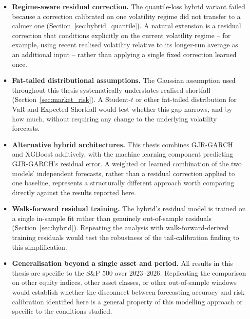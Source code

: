 \documentclass[12pt,a4paper]{article}
\begin{document}
\begin{itemize}
    \item \textbf{Regime-aware residual correction.} The quantile-loss hybrid variant failed
    because a correction calibrated on one volatility regime did not transfer to a calmer one
    (Section~\ref{sec:hybrid_quantile}). A natural extension is a residual correction that
    conditions explicitly on the current volatility regime -- for example, using recent realised
    volatility relative to its longer-run average as an additional input -- rather than applying
    a single fixed correction learned once.

    \item \textbf{Fat-tailed distributional assumptions.} The Gaussian assumption used throughout
    this thesis systematically understates realised shortfall (Section~\ref{sec:market_risk}). A
    Student-$t$ or other fat-tailed distribution for VaR and Expected Shortfall would test whether
    this gap narrows, and by how much, without requiring any change to the underlying volatility
    forecasts.

    \item \textbf{Alternative hybrid architectures.} This thesis combines GJR-GARCH and XGBoost
    additively, with the machine learning component predicting GJR-GARCH's residual error. A
    weighted or learned combination of the two models' independent forecasts, rather than a
    residual correction applied to one baseline, represents a structurally different approach
    worth comparing directly against the results reported here.

    \item \textbf{Walk-forward residual training.} The hybrid's residual model is trained on a
    single in-sample fit rather than genuinely out-of-sample residuals (Section~\ref{sec:hybrid}).
    Repeating the analysis with walk-forward-derived training residuals would test the robustness
    of the tail-calibration finding to this simplification.

    \item \textbf{Generalisation beyond a single asset and period.} All results in this thesis are
    specific to the S\&P 500 over 2023--2026. Replicating the comparison on other equity indices,
    other asset classes, or other out-of-sample windows would establish whether the disconnect
    between forecasting accuracy and risk calibration identified here is a general property of
    this modelling approach or specific to the conditions studied.
\end{itemize}
\end{document}

